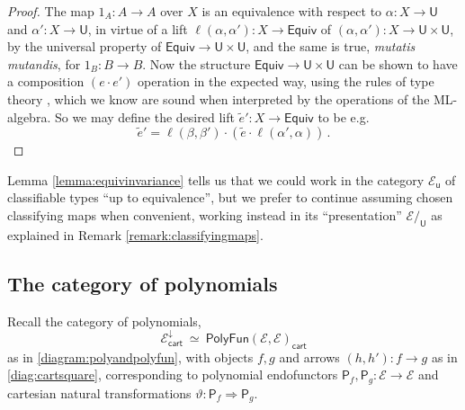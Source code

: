 \documentclass[12pt,reqno]{amsart}
\newcommand{\EE}{\ensuremath{\mathcal{E}}}
\newcommand{\alg}[1]{\ensuremath{\mathsf{#1}}}
\renewcommand{\to}{\ensuremath{\rightarrow}}
\renewcommand{\t}{\ensuremath{\mathsf{u}}}
\newcommand{\T}{\ensuremath{\mathsf{U}}}
\theoremstyle{remark}
\theoremstyle{definition}
\begin{document}
\begin{proof}
The map $1_A : A \to A$ over $X$ is an equivalence with respect to $\alpha: X \to \T$ and $\alpha': X \to \T$, in virtue of a lift $\ell(\alpha, \alpha') : X \to\mathsf{Equiv}$ of $(\alpha, \alpha') : X \to \T\times \T$, by the universal property of $\mathsf{Equiv} \to \T\times \T$, and the same is true, \emph{mutatis mutandis}, for  $1_B : B \to B$.  Now the structure $\mathsf{Equiv} \to \T\times \T$ can be shown to have a composition $(e\cdot e')$ operation in the expected way, using the rules of type theory \cite[Theorem 4.7.1]{HoTTbook}, which we know are sound when interpreted by the operations of the ML-algebra.  So we may define the desired lift ${\tilde{e}}' : X \to \mathsf{Equiv}$ to be e.g. $${\tilde{e}}' = \ell(\beta, \beta') \cdot ({\tilde{e}}\cdot\ell(\alpha', \alpha))\,.$$
\end{proof}
%
Lemma \ref{lemma:equivinvariance} tells us that we could work in the category $\EE_\t$ of classifiable types ``up to equivalence'', but we prefer to continue assuming chosen classifying maps when convenient, working instead in its ``presentation'' $\EE/_\T$ as explained in Remark \ref{remark:classifyingmaps}.

\subsection{The category of polynomials}\label{sec:2cells}

Recall the category of polynomials, 
\[
\EE^{\downarrow}_{\mathsf{cart}}\ \simeq\ \mathsf{PolyFun}(\EE, \EE)_{\mathsf{cart}}
\]
as in \eqref{diagram:polyandpolyfun}, with objects $f, g$ and arrows $(h, h') : f \to g$ as in \eqref{diag:cartsquare}, corresponding to polynomial endofunctors $\alg{P}_f, \alg{P}_g : \EE \to \EE$ and cartesian natural transformations $\vartheta : \alg{P}_f \Rightarrow \alg{P}_g$.
\end{document}
